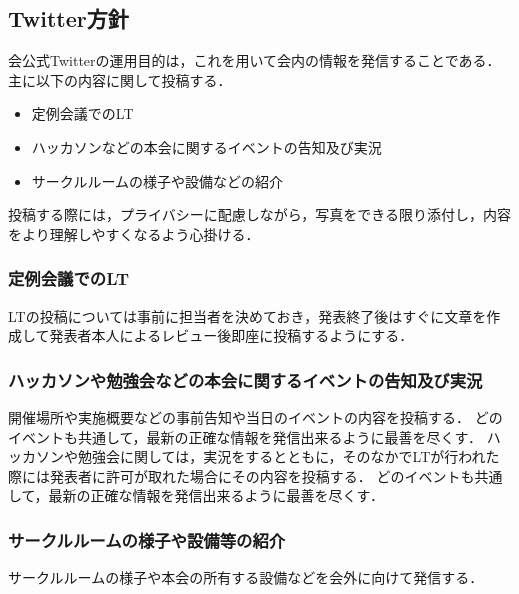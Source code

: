 \subsection*{Twitter方針}


会公式Twitterの運用目的は，これを用いて会内の情報を発信することである．主に以下の内容に関して投稿する．

\begin{itemize}
\item 定例会議でのLT
\item ハッカソンなどの本会に関するイベントの告知及び実況
\item サークルルームの様子や設備などの紹介
\end{itemize}

投稿する際には，プライバシーに配慮しながら，写真をできる限り添付し，内容をより理解しやすくなるよう心掛ける．

\subsubsection*{定例会議でのLT}
LTの投稿については事前に担当者を決めておき，発表終了後はすぐに文章を作成して発表者本人によるレビュー後即座に投稿するようにする．

\subsubsection*{ハッカソンや勉強会などの本会に関するイベントの告知及び実況}
開催場所や実施概要などの事前告知や当日のイベントの内容を投稿する．
どのイベントも共通して，最新の正確な情報を発信出来るように最善を尽くす．
ハッカソンや勉強会に関しては，実況をするとともに，そのなかでLTが行われた際には発表者に許可が取れた場合にその内容を投稿する．
どのイベントも共通して，最新の正確な情報を発信出来るように最善を尽くす．

\subsubsection*{サークルルームの様子や設備等の紹介}
サークルルームの様子や本会の所有する設備などを会外に向けて発信する．

